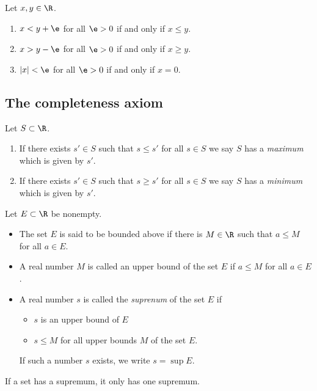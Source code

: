 \documentclass{article}
\begin{document}
\begin{theorem}
	Let $x,y\in\R$.
	\begin{enumerate}
		\item $x<y+\e$ for all $\e>0$ if and only if $x\leq y$.
		\item $x>y-\e$ for all $\e>0$ if and only if $x\geq y$.
		\item $|x|<\e$ for all $\e>0$ if and only if $x=0$.
	\end{enumerate}
\end{theorem}

\subsection{The completeness axiom}

\begin{definition}
	Let $S\subset\R$.
	\begin{enumerate}
		\item If there exists $s'\in S$ such that $s\leq s'$ for all $s\in S$ we say $S$ has a
		      \emph{maximum} which is given by $s'$.
		\item If there exists $s'\in S$ such that $s\geq s'$ for all $s\in S$ we say $S$ has a
		      \emph{minimum} which is given by $s'$.
	\end{enumerate}
\end{definition}

\begin{definition}
	Let $E\subset\R$ be nonempty.
	\begin{itemize}
		\item The set $E$ is said to be bounded above if there is $M\in\R$ such that $a\leq M$ for all $a\in E$.
		\item A real number $M$ is called an upper bound of the set $E$ if $a\leq M$ for all $a\in E$.
		\item A real number $s$ is called the \emph{suprenum} of the set $E$ if \begin{itemize}
			      \item $s$ is an upper bound of $E$
			      \item $s\leq M$ for all upper bounds $M$ of the set $E$.
		      \end{itemize}
		      If such a number $s$ exists, we write $s=\sup E$.
	\end{itemize}
\end{definition}

\setcounter{theorem}{3}
\begin{lemma}
	If a set has a supremum, it only has one supremum.
\end{lemma}
\end{document}
